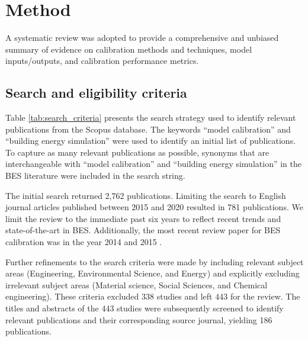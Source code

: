 \documentclass[review]{elsarticle}
\begin{document}
\section{Method} \label{sec:method}

A systematic review was adopted to provide a comprehensive and unbiased summary of evidence on calibration methods and techniques, model inputs/outputs, and calibration performance metrics.

\subsection{Search and eligibility criteria}

Table \ref{tab:search_criteria} presents the search strategy used to identify relevant publications from the Scopus database. The keywords ``model calibration'' and ``building energy simulation'' were used to identify an initial list of publications. To capture as many relevant publications as possible, synonyms that are interchangeable with ``model calibration'' and ``building energy simulation'' in the BES literature were included in the search string. 

The initial search returned 2,762 publications. Limiting the search to English journal articles published between 2015 and 2020 resulted in 781 publications. We limit the review to the immediate past six years to reflect recent trends and state-of-the-art in BES. Additionally, the most recent review paper for BES calibration was in the year 2014 \cite{coakley2014review} and 2015 \cite{fabrizio2015methodologies}. 

Further refinements to the search criteria were made by including relevant subject areas (Engineering, Environmental Science, and Energy) and explicitly excluding irrelevant subject areas (Material science, Social Sciences, and Chemical engineering). These criteria excluded 338 studies and left 443 for the review. The titles and abstracts of the 443 studies were subsequently screened to identify relevant publications and their corresponding source journal, yielding 186 publications. 
\end{document}
